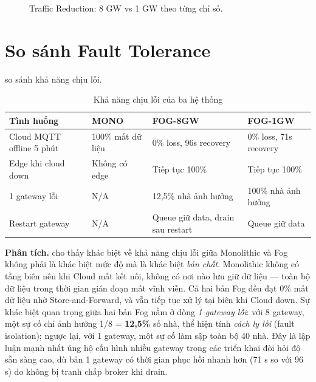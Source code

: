 \documentclass[13pt,a4paper]{report}
\begin{document}
\begin{figure}[H]
\centering
{}
\caption{Traffic Reduction: 8 GW vs 1 GW theo từng chỉ số.}
\label{fig:traffic-reduction}
\end{figure}

\section{So sánh Fault Tolerance}

 so sánh khả năng chịu lỗi.

\begin{table}[H]
\centering
\caption{Khả năng chịu lỗi của ba hệ thống}
\label{tab:fault}
\small
\begin{tabular}{p{} p{} p{} p{}}
\toprule
\textbf{Tình huống} & \textbf{MONO} & \textbf{FOG-8GW} & \textbf{FOG-1GW} \\
\midrule
Cloud MQTT offline 5 phút & 100\% mất dữ liệu & 0\% loss, 96s recovery & 0\% loss, 71s recovery \\
Edge khi cloud down       & Không có edge     & Tiếp tục 100\%        & Tiếp tục 100\% \\
1 gateway lỗi             & N/A               & 12,5\% nhà ảnh hưởng  & 100\% nhà ảnh hưởng \\
Restart gateway           & N/A               & Queue giữ data, drain sau restart & Queue giữ data \\
\bottomrule
\end{tabular}
\end{table}

\textbf{Phân tích.}  cho thấy khác biệt về khả năng chịu lỗi giữa
Monolithic và Fog không phải là khác biệt mức độ mà là khác biệt \textit{bản
chất}. Monolithic không có tầng biên nên khi Cloud mất kết nối, không có nơi nào
lưu giữ dữ liệu --- toàn bộ dữ liệu trong thời gian gián đoạn mất vĩnh viễn. Cả
hai bản Fog đều đạt 0\% mất dữ liệu nhờ Store-and-Forward, và vẫn tiếp tục xử lý
tại biên khi Cloud down. Sự khác biệt quan trọng giữa hai bản Fog nằm ở dòng
\textit{1 gateway lỗi}: với 8 gateway, một sự cố chỉ ảnh hưởng 1/8 = \textbf{12,5\%}
số nhà, thể hiện tính \textit{cách ly lỗi} (fault isolation); ngược lại, với 1
gateway, một sự cố làm sập toàn bộ 40 nhà. Đây là lập luận mạnh nhất ủng hộ cấu
hình nhiều gateway trong các triển khai đòi hỏi độ sẵn sàng cao, dù bản 1 gateway
có thời gian phục hồi nhanh hơn (71 s so với 96 s) do không bị tranh chấp broker
khi drain.
\end{document}
